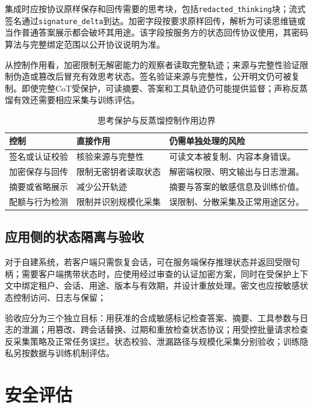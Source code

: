 \documentclass[../textbook.tex]{subfiles}
\begin{document}
集成时应按协议原样保存和回传需要的思考块，包括\texttt{redacted\_thinking}块；流式签名通过\texttt{signature\_delta}到达。加密字段按要求原样回传，解析为可读思维链或当作普通答案展示都会破坏其用途。该字段按服务方的状态回传协议使用，其密码算法与完整绑定范围以公开协议说明为准\cite{anthropic2026thinking}。

从控制作用看，加密限制无解密能力的观察者读取完整轨迹；来源与完整性验证限制伪造或篡改后冒充有效思考状态。签名验证来源与完整性，公开明文仍可被复制。即使完整CoT受保护，可读摘要、答案和工具轨迹仍可能提供监督；声称反蒸馏有效还需要相应采集与训练评估。

\begin{table}[htbp]
\centering
\caption{思考保护与反蒸馏控制作用边界}\label{tab:security-thinking-protection}
\begin{tabularx}{\linewidth}{@{}lXX@{}}
\toprule 控制 & 直接作用 & 仍需单独处理的风险\\\midrule
签名或认证校验 & 核验来源与完整性 & 可读文本被复制、内容本身错误。\\
加密保存与回传 & 限制无密钥者读取状态 & 解密端权限、明文输出与日志泄漏。\\
摘要或省略展示 & 减少公开轨迹 & 摘要与答案的敏感信息及训练价值。\\
配额与行为检测 & 限制并识别规模化采集 & 误限制、分散采集及正常用途区分。\\
\bottomrule
\end{tabularx}
\end{table}

\subsection{应用侧的状态隔离与验收}
对于自建系统，若客户端只需恢复会话，可在服务端保存推理状态并返回受限句柄；需要客户端携带状态时，应使用经过审查的认证加密方案，同时在受保护上下文中绑定租户、会话、用途、版本与有效期，并设计重放处理。密文也应按敏感状态控制访问、日志与保留；

验收应分为三个独立目标：用获准的合成敏感标记检查答案、摘要、工具参数与日志的泄漏；用篡改、跨会话替换、过期和重放检查状态协议；用受控批量请求检查反采集策略及正常任务误拦。状态校验、泄漏路径与规模化采集分别验收；训练隐私另按数据与训练机制评估。

\section{安全评估}
\end{document}
